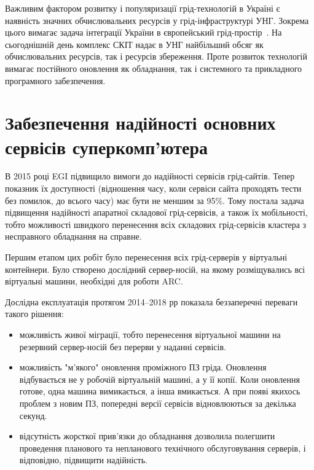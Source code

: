 
Важливим фактором розвитку і популяризації грід-технологій в Україні є наявність значних обчислювальних ресурсів у грід-інфраструктурі УНГ. Зокрема цього вимагає задача інтеграції України в європейський грід-простір~\cite{erevan-grid-2013}. На сьогоднішній день комплекс СКІТ надає в УНГ найбільший обсяг як обчислювальних ресурсів, так і ресурсів збереження. Проте розвиток технологій вимагає постійного оновлення як обладнання, так і системного та прикладного програмного забезпечення.


\section{Забезпечення надійності основних сервісів суперкомп'ютера}

В 2015 році EGI підвищило вимоги до надійності сервісів грід-сайтів. Тепер показник їх доступності (відношення часу, коли сервіси сайта проходять тести без помилок, до всього часу) має бути не меншим за 95\%. Тому постала задача підвищення надійності апаратної складової грід-сервісів, а також їх мобільності, тобто можливості швидкого перенесення всіх складових грід-сервісів кластера з несправного обладнання на справне.

Першим етапом цих робіт було перенесення всіх грід-серверів у віртуальні контейнери.  Було створено дослідний сервер-носій, на якому розміщувались всі віртуальні машини, необхідні для роботи ARC.

Дослідна експлуатація протягом 2014--2018 рр показала беззаперечні переваги такого рішення:

\begin{itemize}
\item можливість живої міграції, тобто перенесення віртуальної машини на резервний сервер-носій без перерви у наданні сервісів.
\item можливість "м'якого" оновлення проміжного ПЗ гріда. Оновлення відбувається не у робочій віртуальній машині, а у її копії. Коли оновлення готове, одна машина вимикається, а інша вмикається. А при появі якихось проблем з новим ПЗ, попередні версії сервісів відновлюються за декілька секунд.
\item відсутність жорсткої прив'язки до обладнання дозволила полегшити проведення планового та непланового технічного обслуговування серверів, і відповідно, підвищити надійність.                                                                                                                                                                              \end{itemize}

